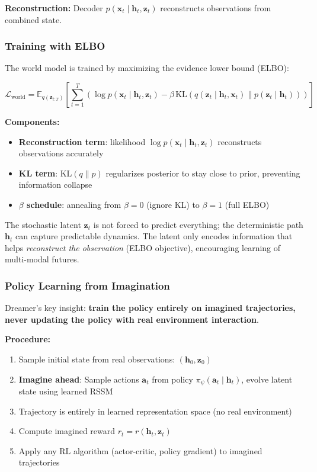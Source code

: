 \textbf{Reconstruction:} Decoder $p(\mathbf{x}_t \mid \mathbf{h}_t, \mathbf{z}_t)$ reconstructs observations from combined state.

\subsubsection{Training with ELBO}

The world model is trained by maximizing the evidence lower bound (ELBO):

\[
\mathcal{L}_{\text{world}} = \mathbb{E}_{q(\mathbf{z}_{t:T})} \left[ \sum_{t=1}^T \left( \log p(\mathbf{x}_t \mid \mathbf{h}_t, \mathbf{z}_t) - \beta \, \text{KL}(q(\mathbf{z}_t \mid \mathbf{h}_t, \mathbf{x}_t) \| p(\mathbf{z}_t \mid \mathbf{h}_t)) \right) \right]
\]

\textbf{Components:}
\begin{itemize}
    \item \textbf{Reconstruction term}: likelihood $\log p(\mathbf{x}_t \mid \mathbf{h}_t, \mathbf{z}_t)$ reconstructs observations accurately
    \item \textbf{KL term}: $\text{KL}(q \| p)$ regularizes posterior to stay close to prior, preventing information collapse
    \item \textbf{$\beta$ schedule}: annealing from $\beta=0$ (ignore KL) to $\beta=1$ (full ELBO)
\end{itemize}

\begin{intuitionbox}
    The stochastic latent $\mathbf{z}_t$ is not forced to predict everything; the deterministic path $\mathbf{h}_t$ can capture predictable dynamics. The latent only encodes information that helps \textit{reconstruct the observation} (ELBO objective), encouraging learning of multi-modal futures.
\end{intuitionbox}

\subsubsection{Policy Learning from Imagination}

Dreamer's key insight: \textbf{train the policy entirely on imagined trajectories, never updating the policy with real environment interaction}.

\textbf{Procedure:}

\begin{enumerate}
    \item Sample initial state from real observations: $(\mathbf{h}_0, \mathbf{z}_0)$
    \item \textbf{Imagine ahead}: Sample actions $\mathbf{a}_t$ from policy $\pi_\psi(\mathbf{a}_t \mid \mathbf{h}_t)$, evolve latent state using learned RSSM
    \item Trajectory is entirely in learned representation space (no real environment)
    \item Compute imagined reward $r_t = r(\mathbf{h}_t, \mathbf{z}_t)$
    \item Apply any RL algorithm (actor-critic, policy gradient) to imagined trajectories
\end{enumerate}

